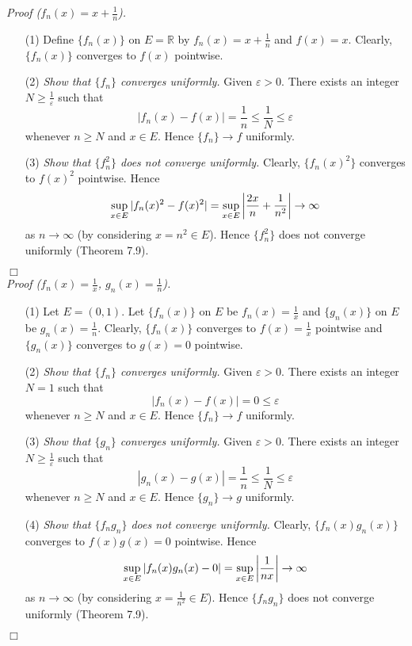 \documentclass{article}
\begin{document}
\emph{Proof ($f_n(x) = x + \frac{1}{n}$).}
\begin{enumerate}
  \item[(1)]
  Define $\{f_n(x)\}$ on $E = \mathbb{R}$ by $f_n(x) = x + \frac{1}{n}$ and $f(x) = x$.
  Clearly, $\{f_n(x)\}$ converges to $f(x)$ pointwise.

  \item[(2)]
  \emph{Show that $\{f_n\}$ converges uniformly.}
  Given $\varepsilon > 0$.
  There exists an integer $N \geq \frac{1}{\varepsilon}$ such that
  \[
    |f_n(x) - f(x)| = \frac{1}{n} \leq \frac{1}{N} \leq \varepsilon
  \]
  whenever $n \geq N$ and $x \in E$.
  Hence $\{f_n\} \to f$ uniformly.

  \item[(3)]
  \emph{Show that $\{f_n^2\}$ does not converge uniformly.}
  Clearly, $\{f_n(x)^2\}$ converges to $f(x)^2$ pointwise.
  Hence
  \[
    \sup_{x \in E} |f_n(x)^2 - f(x)^2|
    = \sup_{x \in E} \abs{\frac{2x}{n} + \frac{1}{n^2}}
    \to \infty
  \]
  as $n \to \infty$ (by considering $x = n^2 \in E$).
  Hence $\{f_n^2 \}$ does not converge uniformly (Theorem 7.9).
\end{enumerate}
$\Box$ \\

\emph{Proof ($f_n(x) = \frac{1}{x}$, $g_n(x) = \frac{1}{n}$).}
\begin{enumerate}
  \item[(1)]
  Let $E = (0,1)$.
  Let $\{f_n(x)\}$ on $E$ be $f_n(x) = \frac{1}{x}$
  and $\{g_n(x)\}$ on $E$ be $g_n(x) = \frac{1}{n}$.
  Clearly, $\{f_n(x)\}$ converges to $f(x) = \frac{1}{x}$ pointwise
  and $\{g_n(x)\}$ converges to $g(x) = 0$ pointwise.

  \item[(2)]
  \emph{Show that $\{f_n\}$ converges uniformly.}
  Given $\varepsilon > 0$.
  There exists an integer $N = 1$ such that
  \[
    |f_n(x) - f(x)| = 0 \leq \varepsilon
  \]
  whenever $n \geq N$ and $x \in E$.
  Hence $\{f_n\} \to f$ uniformly.

  \item[(3)]
  \emph{Show that $\{g_n\}$ converges uniformly.}
  Given $\varepsilon > 0$.
  There exists an integer $N \geq \frac{1}{\varepsilon}$ such that
  \[
    |g_n(x) - g(x)| = \frac{1}{n} \leq \frac{1}{N} \leq \varepsilon
  \]
  whenever $n \geq N$ and $x \in E$.
  Hence $\{g_n\} \to g$ uniformly.

  \item[(4)]
  \emph{Show that $\{f_n g_n\}$ does not converge uniformly.}
  Clearly, $\{f_n(x) g_n(x) \}$ converges to $f(x) g(x) = 0$ pointwise.
  Hence
  \[
    \sup_{x \in E} |f_n(x) g_n(x) - 0|
    = \sup_{x \in E} \abs{\frac{1}{nx}}
    \to \infty
  \]
  as $n \to \infty$ (by considering $x = \frac{1}{n^2} \in E$).
  Hence $\{f_n g_n \}$ does not converge uniformly (Theorem 7.9).
\end{enumerate}
$\Box$ \\
\end{document}
